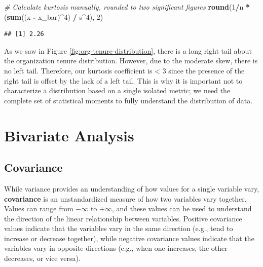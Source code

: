 \documentclass[]{book}
\newenvironment{Shaded}{\begin{snugshade}}{\end{snugshade}}
\newcommand{\CommentTok}[1]{\textcolor[rgb]{0.56,0.35,0.01}{\textit{#1}}}
\newcommand{\DecValTok}[1]{\textcolor[rgb]{0.00,0.00,0.81}{#1}}
\newcommand{\KeywordTok}[1]{\textcolor[rgb]{0.13,0.29,0.53}{\textbf{#1}}}
\newcommand{\NormalTok}[1]{#1}
\newcommand{\OperatorTok}[1]{\textcolor[rgb]{0.81,0.36,0.00}{\textbf{#1}}}
\newcommand{\StringTok}[1]{\textcolor[rgb]{0.31,0.60,0.02}{#1}}
\begin{document}
\begin{Shaded}
\begin{Highlighting}[]
\CommentTok{# Calculate kurtosis manually, rounded to two significant figures}
\KeywordTok{round}\NormalTok{(}\DecValTok{1}\OperatorTok{/}\NormalTok{n }\OperatorTok{*}\StringTok{ }\NormalTok{(}\KeywordTok{sum}\NormalTok{((x }\OperatorTok{-}\StringTok{ }\NormalTok{x_bar)}\OperatorTok{^}\DecValTok{4}\NormalTok{) }\OperatorTok{/}\StringTok{ }\NormalTok{s}\OperatorTok{^}\DecValTok{4}\NormalTok{), }\DecValTok{2}\NormalTok{)}
\end{Highlighting}
\end{Shaded}

\begin{verbatim}
## [1] 2.26
\end{verbatim}

As we saw in Figure \ref{fig:org-tenure-distribution}, there is a long right tail about the organization tenure distribution. However, due to the moderate skew, there is no left tail. Therefore, our kurtosis coefficient is \textless{} 3 since the presence of the right tail is offset by the lack of a left tail. This is why it is important not to characterize a distribution based on a single isolated metric; we need the complete set of statistical moments to fully understand the distribution of data.

\hypertarget{bivariate-analysis}{%
\section{Bivariate Analysis}\label{bivariate-analysis}}

\hypertarget{covariance}{%
\subsection{Covariance}\label{covariance}}

While variance provides an understanding of how values for a single variable vary, \textbf{covariance} is an unstandardized measure of how two variables vary together. Values can range from \(-\infty\) to \(+\infty\), and these values can be used to understand the direction of the linear relationship between variables. Positive covariance values indicate that the variables vary in the same direction (e.g., tend to increase or decrease together), while negative covariance values indicate that the variables vary in opposite directions (e.g., when one increases, the other decreases, or vice versa).
\end{document}
